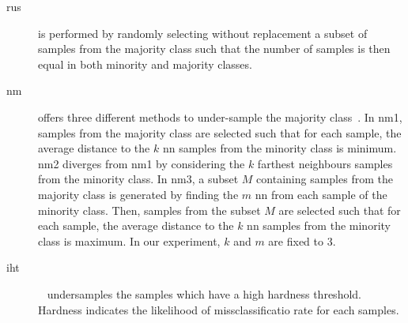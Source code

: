\begin{description}
  \item[\Ac{rus}] is performed by randomly selecting without replacement a subset of samples from the majority class such that the number of samples is then equal in both minority and majority classes.
  \item[\Ac{nm}] offers three different methods to under-sample the majority class~\cite{mani2003knn}.
In \ac{nm1}, samples from the majority class are selected such that for each sample, the average distance to the $k$ \ac{nn} samples from the minority class is minimum.
\ac{nm2} diverges from \ac{nm1} by considering the $k$ farthest neighbours samples from the minority class.
In \ac{nm3}, a subset $M$ containing samples from the majority class is generated by finding the $m$ \ac{nn} from each sample of the minority class.
Then, samples from the subset $M$ are selected such that for each sample, the average distance to the $k$ \ac{nn} samples from the minority class is maximum.
In our experiment, $k$ and $m$ are fixed to 3.
\item[\Ac{iht}]~\cite{smith2014instance} undersamples the samples which have a high hardness threshold.
Hardness indicates the likelihood of missclassificatio rate for each samples.  
\end{description}

